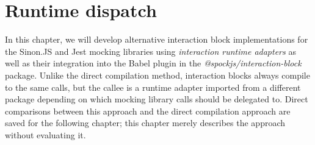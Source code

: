 \chapter{Runtime dispatch}\label{chap:RuntimeDispatch}
In this chapter, we will develop
alternative interaction block implementations
for the Sinon.JS and Jest mocking libraries
using \textit{interaction runtime adapters}
as well as their integration into the Babel plugin
in the \textit{@spockjs/interaction-block} package.
Unlike the direct compilation method,
interaction blocks always compile to the same calls,
but the callee is a runtime adapter
imported from a different package
depending on which mocking library
calls should be delegated to.
Direct comparisons between this approach
and the direct compilation approach
are saved for the following chapter;
this chapter merely describes the approach
without evaluating it.










